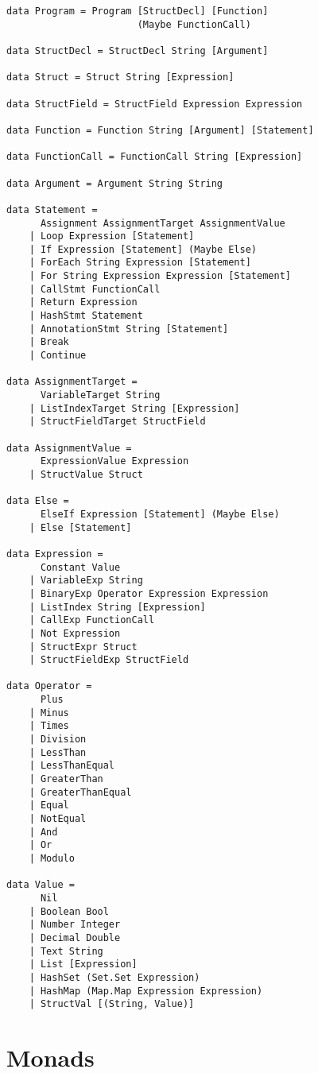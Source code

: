 \begin{lstlisting}[caption={Psnodig's data types in Haskell.}, captionpos=b, label={Psnodig's data types in Haskell.}]
data Program = Program [StructDecl] [Function] 
                       (Maybe FunctionCall)

data StructDecl = StructDecl String [Argument]

data Struct = Struct String [Expression]

data StructField = StructField Expression Expression

data Function = Function String [Argument] [Statement]

data FunctionCall = FunctionCall String [Expression]

data Argument = Argument String String

data Statement =
      Assignment AssignmentTarget AssignmentValue
    | Loop Expression [Statement]
    | If Expression [Statement] (Maybe Else)
    | ForEach String Expression [Statement]
    | For String Expression Expression [Statement]
    | CallStmt FunctionCall
    | Return Expression
    | HashStmt Statement
    | AnnotationStmt String [Statement]
    | Break
    | Continue

data AssignmentTarget =
      VariableTarget String
    | ListIndexTarget String [Expression]
    | StructFieldTarget StructField

data AssignmentValue =
      ExpressionValue Expression
    | StructValue Struct

data Else =
      ElseIf Expression [Statement] (Maybe Else)
    | Else [Statement]

data Expression =
      Constant Value
    | VariableExp String
    | BinaryExp Operator Expression Expression
    | ListIndex String [Expression]
    | CallExp FunctionCall
    | Not Expression
    | StructExpr Struct
    | StructFieldExp StructField

data Operator =
      Plus
    | Minus
    | Times
    | Division
    | LessThan
    | LessThanEqual
    | GreaterThan
    | GreaterThanEqual
    | Equal
    | NotEqual
    | And
    | Or
    | Modulo

data Value =
      Nil
    | Boolean Bool
    | Number Integer
    | Decimal Double
    | Text String
    | List [Expression]
    | HashSet (Set.Set Expression)
    | HashMap (Map.Map Expression Expression)
    | StructVal [(String, Value)]
\end{lstlisting}

\section{Monads}

